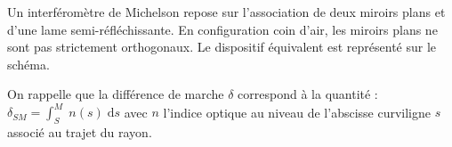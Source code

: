 
\finEntrainement

\newpage


\hauteurLargeurCadreReponse		{8mm}{2.0cm}
\initialisationEntrainement


                                \initialisationPartieGauche %
Un interféromètre de Michelson repose sur l'association de deux miroirs plans et d'une lame semi-réfléchissante. En configuration coin d'air, les miroirs plans ne sont pas strictement orthogonaux. Le dispositif équivalent est représenté sur le schéma. 

\smallskip

On rappelle que la différence de marche $\delta$ correspond à la quantité : $\delta_{SM} = \int_S^M \; n(s) \; \mathrm{d}s$ avec $n$ l'indice optique au niveau de l'abscisse curviligne $s$ associé au trajet du rayon.

                                \initialisationPartieDroite %


